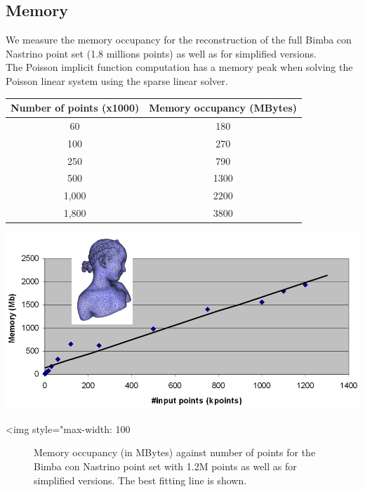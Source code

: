 \subsection{Memory}

We measure the memory occupancy for the reconstruction of the full Bimba con Nastrino point set (1.8 millions points) as well as for simplified versions.\\
The Poisson implicit function computation has a memory peak when solving the Poisson linear system using the sparse linear solver.  \\

\begin{tabular}{|c|c|}
  \hline
  Number of points (x1000) & Memory occupancy (MBytes) \\
  \hline
  60                         & 180 \\
  100                        & 270 \\
  250                        & 790 \\
  500                        & 1300 \\
  1,000                       & 2200 \\
  1,800                       & 3800 \\
  \hline
\end{tabular}

\begin{center}
    \begin{ccTexOnly}
        \includegraphics[width=1.0\textwidth]{Surface_reconstruction_points_3/memory_bench}
    \end{ccTexOnly}
    \begin{ccHtmlOnly}
        <img style="max-width: 100%
    \end{ccHtmlOnly}
    \begin{figure}[h]
        \caption{Memory occupancy (in MBytes) against number of points
                 for the Bimba con Nastrino point set with 1.2M points
                 as well as for simplified versions.
                 The best fitting line is shown.}
        \label{Surface_reconstruction_points_3-fig-memory_bench}
    \end{figure}
\end{center}



